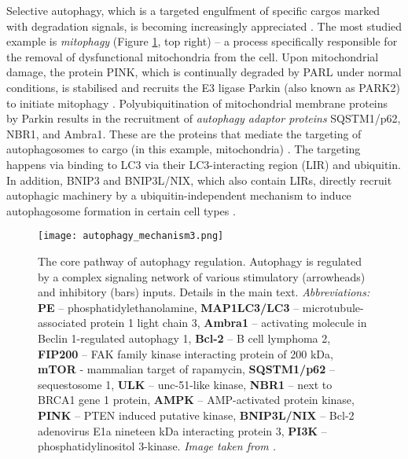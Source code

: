     Selective autophagy, which is a targeted engulfment of specific cargos marked with degradation signals, is becoming increasingly appreciated \cite{Kaur2015}. The most studied example is \textit{mitophagy} (Figure \ref{fig:corepath}, top right) -- a process specifically responsible for the removal of dysfunctional mitochondria from the cell.
    Upon mitochondrial damage, the protein PINK, which is continually degraded by PARL under normal conditions, is stabilised and recruits the E3 ligase Parkin (also known as PARK2) to initiate mitophagy \cite{Kroemer2010}. Polyubiquitination of mitochondrial membrane proteins by Parkin results in the recruitment of \textit{autophagy adaptor proteins} SQSTM1/p62, NBR1, and Ambra1. These are the proteins that mediate the targeting of autophagosomes to cargo (in this example, mitochondria) \cite{Kaur2015}. The targeting happens via binding to LC3 via their LC3-interacting region (LIR) and ubiquitin. In addition, BNIP3 and BNIP3L/NIX, which also contain LIRs, directly recruit autophagic machinery by a ubiquitin-independent mechanism to induce autophagosome formation in certain cell types \cite{Kroemer2010}.\\
    
    
     
        
             \begin{figure}[!h]
            \centering
            \texttt{[image: autophagy\_mechanism3.png]}
            \caption[Autophagy core pathway mechanism]{The core pathway of autophagy regulation. Autophagy is regulated by a complex signaling network of various stimulatory (arrowheads) and inhibitory (bars) inputs. Details in the main text. \textit{Abbreviations:} \textbf{PE} -- phosphatidylethanolamine, \textbf{MAP1LC3/LC3} -- microtubule-associated protein 1 light chain 3, \textbf{Ambra1} -- activating molecule in Beclin 1-regulated autophagy 1, \textbf{Bcl-2} -- B cell lymphoma 2, \textbf{FIP200} -- FAK family kinase interacting protein of 200 kDa, \textbf{mTOR} - mammalian target of rapamycin, \textbf{SQSTM1/p62} -- sequestosome 1, \textbf{ULK} -- unc-51-like kinase, \textbf{NBR1} -- next to BRCA1 gene 1 protein, \textbf{AMPK} -- AMP-activated protein kinase, \textbf{PINK} -- PTEN induced putative kinase, \textbf{BNIP3L/NIX} -- Bcl-2 adenovirus E1a nineteen kDa interacting protein 3, \textbf{PI3K} -- phosphatidylinositol 3-kinase. \textit{Image taken from \cite{AutophagyTechnology}.}
            }
            \label{fig:corepath}
            \end{figure} 

